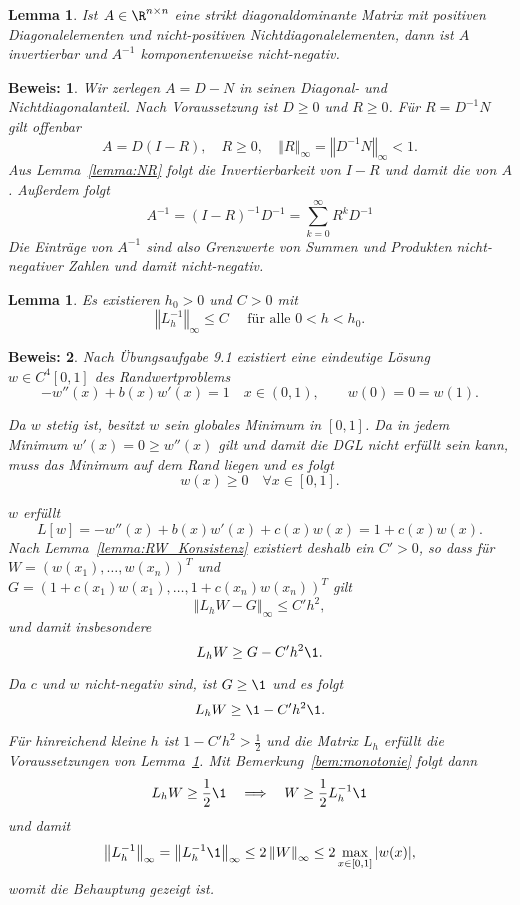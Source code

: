 \documentclass[
]{mycourse}
\theoremstyle{mythm}
\newtheorem{lemma}[theorem]{Lemma}
\theoremstyle{break}
\newtheorem*{beweis}{Beweis:}
\newcommand{\norm}[1]{\left\Vert#1\right\Vert}		%
\begin{document}
\begin{lemma}\label{lemma:wann_M}
Ist $A\in \R^{n\times n}$ eine strikt diagonaldominante Matrix mit positiven Diagonalelementen und nicht-positiven Nichtdiagonalelementen, dann ist $A$ invertierbar und $A^{-1}$ komponentenweise nicht-negativ.
\end{lemma}
\begin{beweis}
Wir zerlegen $A=D-N$ in seinen Diagonal- und Nichtdiagonalanteil. Nach Voraussetzung ist $D\geq 0$ und $R\geq 0$. Für $R=D^{-1} N$ gilt offenbar
\[
A=D (I-R), \quad R\geq 0, \quad \norm{R}_\infty=\norm{D^{-1} N}_\infty<1.
\]
Aus Lemma~\ref{lemma:NR} folgt die Invertierbarkeit von $I-R$ und damit die von $A$.
Außerdem folgt
\[
A^{-1}=(I-R)^{-1} D^{-1} =\sum_{k=0}^\infty {R^k} D^{-1}
\]
Die Einträge von $A^{-1}$ sind also Grenzwerte von Summen und Produkten nicht-negativer Zahlen und damit nicht-negativ.
\end{beweis}


\begin{lemma}\label{lemma:RW_stabil}
Es existieren $h_0>0$ und $C>0$ mit 
\[
\norm{L_h^{-1}}_\infty\leq C \quad \mbox{ für alle } 0<h<h_0.
\]
\end{lemma}
\begin{beweis}
Nach Übungsaufgabe 9.1 existiert eine eindeutige Lösung $w\in C^4[0,1]$ des Randwertproblems
\[
-w''(x) + b(x)w'(x) = 1 \quad x\in (0,1), \qquad w(0)=0=w(1).
\]

Da $w$ stetig ist, besitzt $w$ sein globales Minimum in $[0,1]$. Da in jedem Minimum $w'(x)=0\geq w''(x)$
gilt und damit die DGL nicht erfüllt sein kann, muss das Minimum auf dem Rand liegen und es folgt
\[
w(x)\geq 0 \quad \forall x\in [0,1].
\]


$w$ erfüllt
\[
L[w]=-w''(x) + b(x)w'(x) + c(x)w(x)= 1+c(x)w(x).
\]
Nach Lemma~\ref{lemma:RW_Konsistenz} existiert deshalb ein $C'>0$, so dass für 
$W=(w(x_1),\ldots,w(x_{n}))^T$ 
und $G=(1+c(x_1)w(x_1),\ldots,1+c(x_n)w(x_{n}))^T$ gilt
\[
\norm{L_h W - G}_\infty \leq C' h^2,
\]
und damit insbesondere
\[
L_h W \geq G- C'h^2 \1.
\]

Da $c$ und $w$ nicht-negativ sind, ist $G\geq \1$ und es folgt
\[
L_h W \geq \1 - C' h^2\1.
\]

Für hinreichend kleine $h$ ist $1-C'h^2>\frac{1}{2}$ und die Matrix 
$L_h$ erfüllt die Voraussetzungen von Lemma~\ref{lemma:wann_M}. Mit Bemerkung~\ref{bem:monotonie}
folgt dann
\[
L_h W\geq \frac{1}{2} \1 \quad \Longrightarrow \quad W\geq \frac{1}{2}{L_h^{-1}\1}
\]
und damit 
\[
\norm{L_h^{-1}}_\infty = \norm{L_h^{-1} \1}_\infty \leq 2 \norm{W}_\infty\leq 2 \max_{x\in [0,1]} |w(x)|,
\]
womit die Behauptung gezeigt ist.
\end{beweis}
\end{document}
